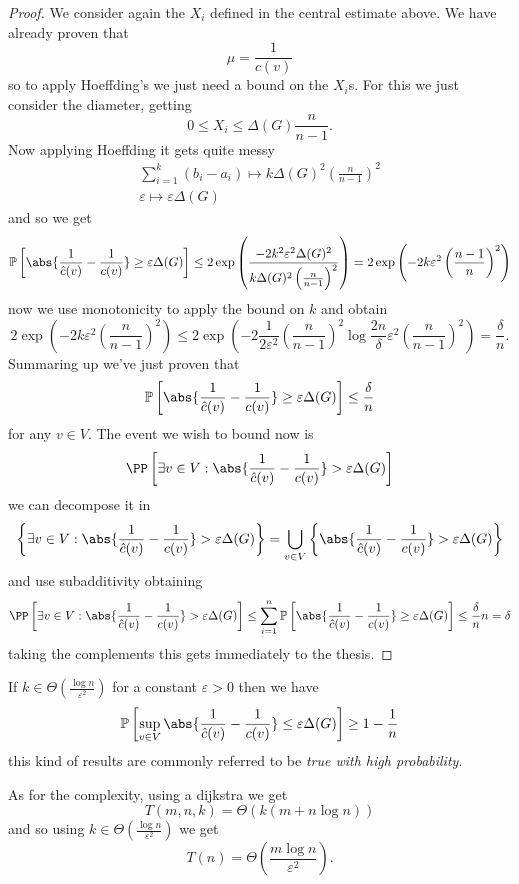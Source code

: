 \documentclass[11pt]{scrartcl}
\newcommand{\bigtheta}[1]{\Theta\!\left(#1\right)}
\begin{document}
	\begin{proof}
		We consider again the $X_i$ defined in the central estimate above. We have already proven that
		$$\mu=\frac{1}{c(v)}$$
		so to apply Hoeffding's we just need a bound on the $X_i$s. For this we just consider the diameter, getting
		$$0\le X_i\le \Delta(G)\frac{n}{n-1}.$$
		Now applying Hoeffding it gets quite messy
		\begin{gather*}
			\sum_{i=1}^{k}\left(b_i-a_i\right)\mapsto k\Delta(G)^2\left(\frac{n}{n-1}\right)^2 \\
			\varepsilon \mapsto \varepsilon \Delta(G)
		\end{gather*}
		and so we get
		$$\mathbb{P}\left[\abs{\frac{1}{\hat{c}(v)}-\frac{1}{c(v)}}\ge \varepsilon\Delta(G)\right]\le 2\exp\left(\frac{-2k^2\varepsilon^2\Delta(G)^2}{k\Delta(G)^2\left(\frac{n}{n-1}\right)^2}\right)=2\exp\left(-2k\varepsilon^2\left(\frac{n-1}{n}\right)^2\right)$$
		now we use monotonicity to apply the bound on $k$ and obtain
		$$2\exp\left(-2k\varepsilon^2\left(\frac{n}{n-1}\right)^2\right)\le 2\exp\left(-2\frac{1}{2\varepsilon^2}\left(\frac{n}{n-1}\right)^2\log\frac{2n}{\delta}\varepsilon^2\left(\frac{n}{n-1}\right)^2\right)=\frac{\delta}{n}.$$
		Summaring up we've just proven that
		$$\mathbb{P}\left[\abs{\frac{1}{\hat{c}(v)}-\frac{1}{c(v)}}\ge \varepsilon\Delta(G)\right]\le\frac{\delta}{n}$$
		for any $v\in V$. The event we wish to bound now is
		$$\PP\left[\exists v\in V : \abs{\frac{1}{\hat{c}(v)}-\frac{1}{c(v)}}>\varepsilon\Delta(G)\right]$$
		we can decompose it in 
		$$\left\{\exists v\in V : \abs{\frac{1}{\hat{c}(v)}-\frac{1}{c(v)}}>\varepsilon\Delta(G)\right\}=\bigcup_{v\in V}\left\{\abs{\frac{1}{\hat{c}(v)}-\frac{1}{c(v)}}>\varepsilon\Delta(G)\right\}$$
		and use subadditivity obtaining
		$$\PP\left[\exists v\in V : \abs{\frac{1}{\hat{c}(v)}-\frac{1}{c(v)}}>\varepsilon\Delta(G)\right]\le \sum_{i=1}^{n}\mathbb{P}\left[\abs{\frac{1}{\hat{c}(v)}-\frac{1}{c(v)}}\ge \varepsilon\Delta(G)\right]\le \frac{\delta}{n}n=\delta$$
		taking the complements this gets immediately to the thesis. 
	\end{proof}
	\begin{corollary}
		If $k\in \bigtheta{\frac{\log n}{\varepsilon^2}}$ for a constant $\varepsilon>0$ then we have 
		$$\mathbb{P}\left[\sup_{v\in V}\abs{\frac{1}{\hat{c}(v)}-\frac{1}{c(v)}}\le \varepsilon\Delta(G)\right]\ge 1-\frac{1}{n}$$
		this kind of results are commonly referred to be \textit{true with high probability}.
	\end{corollary}
	As for the complexity, using a dijkstra we get
	$$T(m,n,k)=\bigtheta{k\left(m+n\log n\right)}$$
	and so using $k\in \bigtheta{\frac{\log n}{\varepsilon^2}}$ we get
	$$T(n)=\bigtheta{\frac{m\log n}{\varepsilon^2}}.$$
	
\end{document}
